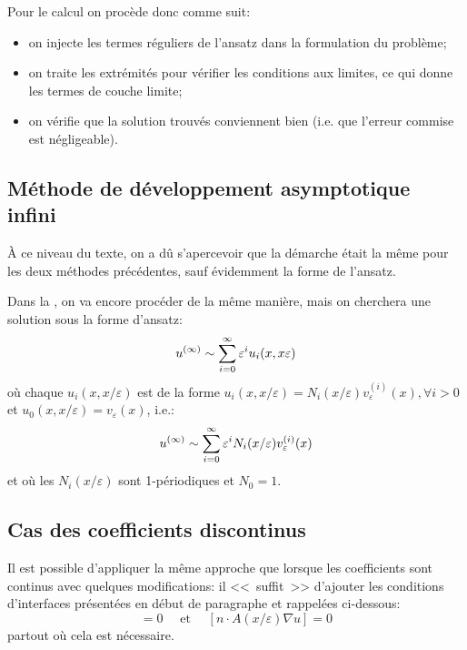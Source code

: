 \medskip
Pour le calcul on procède donc comme suit:
\begin{itemize}
   \item on injecte les termes réguliers de l'ansatz dans la formulation du problème;
   \item on traite les extrémités pour vérifier les conditions aux limites, ce qui donne les termes de couche
	limite;
   \item on vérifie que la solution trouvés conviennent bien (i.e. que l'erreur commise est négligeable).
\end{itemize}


\medskip
\subsection{Méthode de développement asymptotique infini}
À ce niveau du texte, on a dû s'apercevoir que la démarche était la même
pour les deux méthodes précédentes, sauf évidemment la forme de l'ansatz.

Dans la , on va encore procéder
de la même manière, mais on cherchera une solution sous la forme d'ansatz:
\begin{equation}
u^{(\infty)} \sim \displaystyle\sum_{i=0}^\infty \varepsilon^i u_i(x,x\varepsilon)
\end{equation}
où chaque $u_i(x,x/\varepsilon)$ est de la forme $u_i(x,x/\varepsilon)=N_i(x/\varepsilon)v_\varepsilon^{(i)}(x),
\forall i>0$ et $u_0(x,x/\varepsilon)=v_\varepsilon(x)$, i.e.:
\begin{equation}
u^{(\infty)} \sim \displaystyle\sum_{i=0}^\infty \varepsilon^i N_i(x/\varepsilon)v_\varepsilon^{(i)}(x)
\end{equation}
et où les $N_i(x/\varepsilon)$ sont 1-périodiques et $N_0=1$.

\medskip
\subsection{Cas des coefficients discontinus}
Il est possible d'appliquer la même approche que lorsque les coefficients sont continus
avec quelques modifications: il <<~suffit~>> d'ajouter les conditions d'interfaces présentées
en début de paragraphe et rappelées ci-dessous:
\begin{equation} [u]=0 \quad \text{ et } \quad [n\cdot A(x/\varepsilon)\nabla u] = 0\end{equation}
partout où cela est nécessaire.

